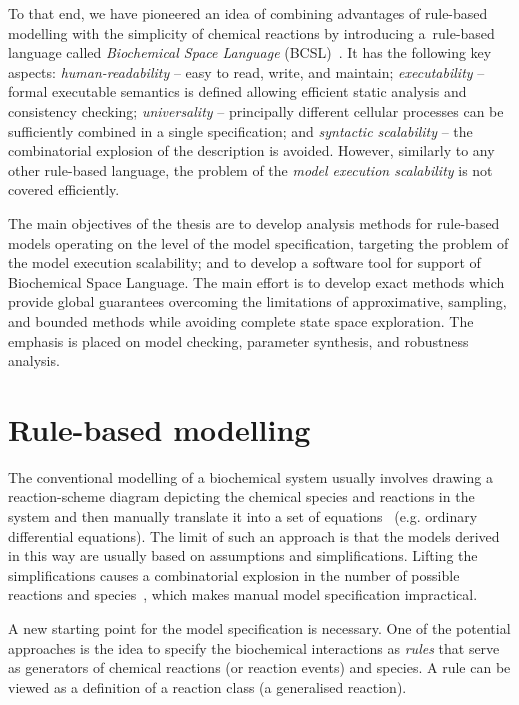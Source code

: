 \documentclass[11pt,a4paper]{report}
\begin{document}
To that end, we have pioneered an idea of combining advantages of rule-based modelling with the simplicity of chemical reactions by introducing a~rule-based language called \emph{Biochemical Space Language} (BCSL)~\cite{dved2016formal}. It has the following key aspects: \emph{human-readability} -- easy to read, write, and maintain;
\emph{executability} -- formal executable semantics is defined allowing efficient static analysis and consistency checking; \emph{universality} -- principally different cellular processes can be sufficiently combined in a single specification; and \emph{syntactic scalability} -- the combinatorial explosion of the description is avoided. However, similarly to any other rule-based language, the problem of the \emph{model execution scalability} is not covered efficiently.

The main objectives of the thesis are to develop analysis methods for rule-based models operating on the level of the model specification, targeting the problem of the model execution scalability; and to develop a software tool for support of Biochemical Space Language. The main effort is to develop exact methods which provide global guarantees overcoming the limitations of approximative, sampling, and bounded methods while avoiding complete state space exploration. The emphasis is placed on model checking, parameter synthesis, and robustness analysis.

\chapter{Rule-based modelling}
\label{formal}

The conventional modelling of a biochemical system usually involves drawing a reaction-scheme diagram depicting the chemical species and reactions in the system and then manually translate it into a set of equations~\cite{voit2000computational} (e.g. ordinary differential equations). The limit of such an approach is that the models derived in this way are usually based on assumptions and simplifications. Lifting the simplifications causes a combinatorial explosion in the number of possible reactions and species~\cite{blinov2006network}, which makes manual model specification impractical.

A new starting point for the model specification is necessary. One of the potential approaches is the idea to specify the biochemical interactions as \emph{rules} that serve as generators of chemical reactions (or reaction events) and species. A rule can be viewed as a definition of a reaction class (a generalised reaction).
\end{document}
